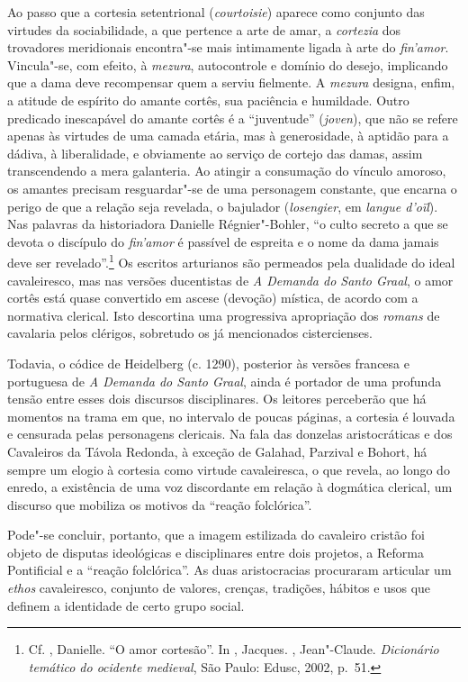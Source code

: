 Ao passo que a cortesia setentrional (\textit{courtoisie}) aparece como conjunto
das virtudes da sociabilidade, a que pertence a arte de amar, a
\textit{cortezia} dos trovadores meridionais encontra"-se mais intimamente ligada
à arte do \textit{fin’amor}. Vincula"-se, com efeito, à \textit{mezura},
autocontrole e domínio do desejo, implicando que a dama deve recompensar quem a
serviu fielmente. A \textit{mezura} designa, enfim, a atitude de espírito do
amante cortês, sua paciência e humildade. Outro predicado inescapável do amante
cortês é a “juventude” (\textit{joven}), que não se refere apenas às virtudes de
uma camada etária, mas à generosidade, à aptidão para a dádiva, à liberalidade,
e obviamente ao serviço de cortejo das damas, assim transcendendo a mera
galanteria. Ao atingir a consumação do vínculo amoroso, os amantes precisam
resguardar"-se de uma personagem constante, que encarna o perigo de que a relação
seja revelada, o bajulador (\textit{losengier}, em \textit{langue d’oïl}). Nas
palavras da historiadora Danielle Régnier"-Bohler, “o culto secreto a que se
devota o discípulo do \textit{fin’amor} é passível de espreita e o nome da dama
jamais deve ser revelado”.\footnote{ Cf. , Danielle.  “O amor
cortesão”. In , Jacques. , Jean"-Claude.  \textit{Dicionário
temático do ocidente medieval}, São Paulo: Edusc, 2002, p.~51.} Os escritos
arturianos são permeados pela dualidade do ideal cavaleiresco, mas nas versões
ducentistas de \textit{A Demanda do Santo Graal}, o amor cortês está quase
convertido em ascese (devoção) mística, de acordo com a normativa clerical. Isto
descortina uma progressiva apropriação dos \textit{romans} de cavalaria pelos
clérigos, sobretudo os já mencionados cistercienses. 

Todavia, o códice de Heidelberg (c. 1290), posterior às versões francesa e
portuguesa de \textit{A Demanda do Santo Graal}, ainda é portador de uma
profunda tensão entre esses dois discursos disciplinares. Os leitores perceberão
que há momentos na trama em que, no intervalo de poucas páginas, a cortesia é
louvada e censurada pelas personagens clericais. Na fala das donzelas
aristocráticas e dos Cavaleiros da Távola Redonda, à exceção de Galahad,
Parzival e Bohort, há sempre um elogio à cortesia como virtude cavaleiresca, o
que revela, ao longo do enredo, a existência de uma voz discordante em relação à
dogmática clerical, um discurso que mobiliza os motivos da ``reação
folclórica''.

Pode"-se concluir, portanto, que a imagem estilizada do cavaleiro cristão foi
objeto de disputas ideológicas e disciplinares entre dois projetos, a Reforma
Pontificial e a ``reação folclórica''. As duas aristocracias procuraram
articular um \textit{ethos} cavaleiresco, conjunto de valores, crenças,
tradições, hábitos e usos que definem a identidade de certo grupo social.

